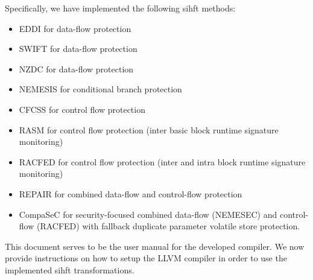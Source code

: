 \documentclass[12pt]{report}
\begin{document}
Specifically, we have implemented the following \ac{sihft} methods:
\begin{itemize}
 \item{EDDI \cite{eddi} for data-flow protection}
 \item{SWIFT \cite{swift} for data-flow protection}
 \item{NZDC \cite{nzdc} for data-flow protection}
 \item{NEMESIS \cite{nemesis} for conditional branch protection}
 \item{CFCSS \cite{cfcss} for control flow protection}
 \item{RASM \cite{rasm} for control flow protection (inter basic block runtime signature monitoring)}
 \item{RACFED \cite{racfed} for control flow protection (inter and intra block runtime signature monitoring)}
 \item{REPAIR \cite{repair} for combined data-flow and control-flow protection}
 \item{CompaSeC \cite{compasec} for security-focused combined data-flow (NEMESEC) and control-flow (RACFED) with fallback duplicate parameter volatile store protection.}
\end{itemize}

This document serves to be the user manual for the developed compiler. We now provide instructions on how to setup the
LLVM compiler in order to use the implemented \ac{sihft} transformations.

\newpage


\newpage




\end{document}

